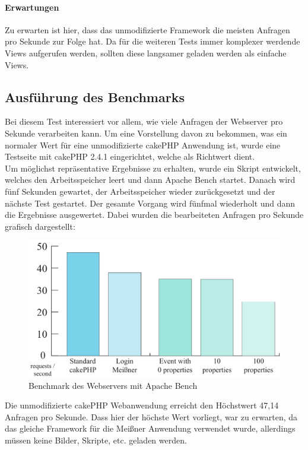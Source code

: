 \paragraph{Erwartungen}
Zu erwarten ist hier, dass das unmodifizierte Framework die meisten Anfragen pro Sekunde zur Folge hat. Da für die weiteren Tests immer komplexer werdende Views aufgerufen werden, sollten diese langsamer geladen werden als einfache Views.

\subsection{Ausführung des Benchmarks}
Bei diesem Test interessiert vor allem, wie viele Anfragen der Webserver pro Sekunde verarbeiten kann. Um eine Vorstellung davon zu bekommen, was ein normaler Wert für eine unmodifizierte cakePHP Anwendung ist, wurde eine Testseite mit cakePHP 2.4.1 eingerichtet, welche als Richtwert dient.\\
Um möglichst repräsentative Ergebnisse zu erhalten, wurde ein Skript entwickelt, welches den Arbeitsspeicher leert und dann Apache Bench startet. Danach wird fünf Sekunden gewartet, der Arbeitsspeicher wieder zurückgesetzt und der nächste Test gestartet. Der gesamte Vorgang wird fünfmal wiederholt und dann die Ergebnisse ausgewertet. Dabei wurden die bearbeiteten Anfragen pro Sekunde grafisch dargestellt:

\begin{figure}[!ht]
	\centering
	\includegraphics[width=15cm]{fig/ab_result}
	\caption{Benchmark des Webservers mit Apache Bench}
\end{figure}

Die unmodifizierte cakePHP Webanwendung erreicht den Höchstwert 47,14 Anfragen pro Sekunde. Dass hier der höchste Wert vorliegt, war zu erwarten, da das gleiche Framework für die Meißner Anwendung verwendet wurde, allerdings müssen keine Bilder, Skripte, etc. geladen werden.\par

